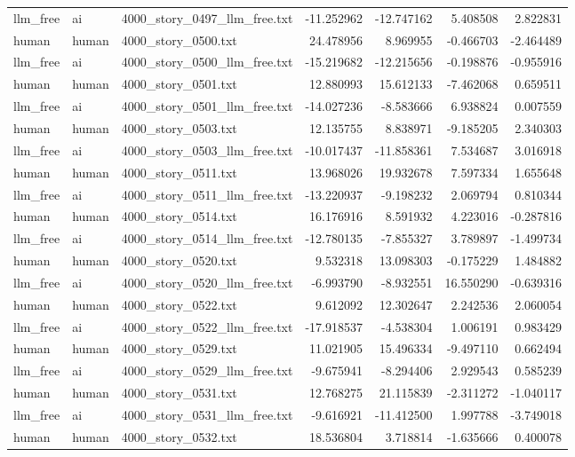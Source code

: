 \begin{longtable}{lllrrrr}
llm\_free & ai & 4000\_story\_0497\_llm\_free.txt & -11.252962 & -12.747162 & 5.408508 & 2.822831 \\
human & human & 4000\_story\_0500.txt & 24.478956 & 8.969955 & -0.466703 & -2.464489 \\
llm\_free & ai & 4000\_story\_0500\_llm\_free.txt & -15.219682 & -12.215656 & -0.198876 & -0.955916 \\
human & human & 4000\_story\_0501.txt & 12.880993 & 15.612133 & -7.462068 & 0.659511 \\
llm\_free & ai & 4000\_story\_0501\_llm\_free.txt & -14.027236 & -8.583666 & 6.938824 & 0.007559 \\
human & human & 4000\_story\_0503.txt & 12.135755 & 8.838971 & -9.185205 & 2.340303 \\
llm\_free & ai & 4000\_story\_0503\_llm\_free.txt & -10.017437 & -11.858361 & 7.534687 & 3.016918 \\
human & human & 4000\_story\_0511.txt & 13.968026 & 19.932678 & 7.597334 & 1.655648 \\
llm\_free & ai & 4000\_story\_0511\_llm\_free.txt & -13.220937 & -9.198232 & 2.069794 & 0.810344 \\
human & human & 4000\_story\_0514.txt & 16.176916 & 8.591932 & 4.223016 & -0.287816 \\
llm\_free & ai & 4000\_story\_0514\_llm\_free.txt & -12.780135 & -7.855327 & 3.789897 & -1.499734 \\
human & human & 4000\_story\_0520.txt & 9.532318 & 13.098303 & -0.175229 & 1.484882 \\
llm\_free & ai & 4000\_story\_0520\_llm\_free.txt & -6.993790 & -8.932551 & 16.550290 & -0.639316 \\
human & human & 4000\_story\_0522.txt & 9.612092 & 12.302647 & 2.242536 & 2.060054 \\
llm\_free & ai & 4000\_story\_0522\_llm\_free.txt & -17.918537 & -4.538304 & 1.006191 & 0.983429 \\
human & human & 4000\_story\_0529.txt & 11.021905 & 15.496334 & -9.497110 & 0.662494 \\
llm\_free & ai & 4000\_story\_0529\_llm\_free.txt & -9.675941 & -8.294406 & 2.929543 & 0.585239 \\
human & human & 4000\_story\_0531.txt & 12.768275 & 21.115839 & -2.311272 & -1.040117 \\
llm\_free & ai & 4000\_story\_0531\_llm\_free.txt & -9.616921 & -11.412500 & 1.997788 & -3.749018 \\
human & human & 4000\_story\_0532.txt & 18.536804 & 3.718814 & -1.635666 & 0.400078 \\

\end{longtable}
